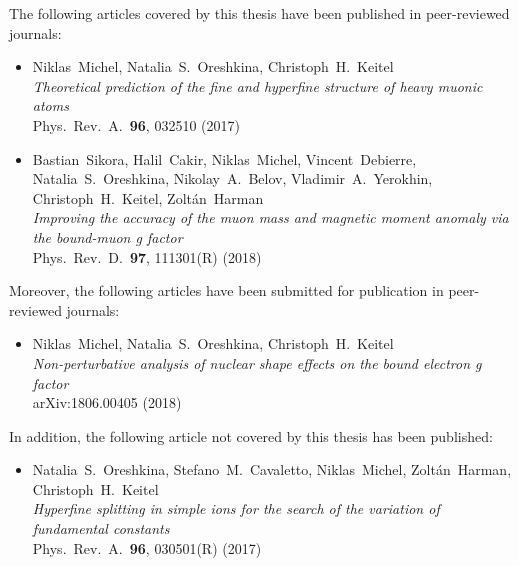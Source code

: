 \ifthispageodd{}{\cleardoublepage}


\noindent \normalfont
The following articles covered by this thesis have been published in peer-reviewed \\journals:

\begin{itemize}
\item Niklas~Michel, Natalia~S.~Oreshkina, Christoph~H.~Keitel \\ 
\textit{Theoretical prediction of the fine and hyperfine structure of heavy muonic atoms} \\ 
Phys.~Rev.~A.~\textbf{96}, 032510 (2017) \vspace*{5pt} \\
%
\item Bastian~Sikora, Halil~Cakir, Niklas~Michel, Vincent~Debierre, Natalia~S.~Oreshkina, Nikolay~A.~Belov, Vladimir~A.~Yerokhin, Christoph~H.~Keitel, Zoltán~Harman \\ 
\textit{Improving the accuracy of the muon mass and magnetic moment anomaly via the bound-muon g factor} \\ 
Phys.~Rev.~D.~\textbf{97}, 111301(R) (2018) \vspace*{5pt} \\
\end{itemize} 

\vspace{1.5cm}

\noindent
Moreover, the following articles have been submitted for publication in peer-reviewed journals:
\begin{itemize}
\item Niklas~Michel, Natalia~S.~Oreshkina, Christoph~H.~Keitel \\ 
\textit{Non-perturbative analysis of nuclear shape effects on the bound electron g factor}\\
arXiv:1806.00405 (2018)
\end{itemize} 

\vspace{1.5cm}

\noindent
In addition, the following article not covered by this thesis has been published:

\begin{itemize}
\item Natalia~S.~Oreshkina, Stefano~M.~Cavaletto, Niklas~Michel, Zoltán~Harman,\\Christoph~H.~Keitel \\ 
\textit{Hyperfine splitting in simple ions for the search of the variation of fundamental constants} \\ 
Phys.~Rev.~A.~\textbf{96}, 030501(R) (2017) \vspace*{5pt} \\
\end{itemize} 

\thispagestyle{empty}
